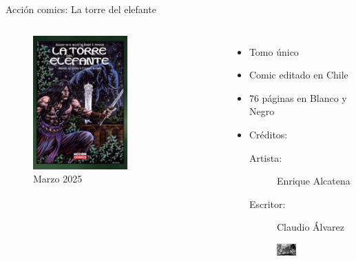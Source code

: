 \begin{frame}{Acción comics: La torre del elefante}
	\begin{columns}
		\begin{figure}[htb]
			\centering
			\includegraphics[width=0.6\textwidth]{img/AlcatenaTorre}
			\caption{Marzo 2025}
		\end{figure}
		\begin{itemize}
			\item Tomo único
			\item Comic editado en Chile
			\item 76 páginas en Blanco y Negro
			\item Créditos:
			\begin{description}
				\item[Artista:] Enrique Alcatena
				\item[Escritor:] Claudio Álvarez
			\end{description}
			\begin{figure}[htb]
				\centering
				\includegraphics[width=0.4\textwidth]{img/AlcatenaTorre2}
			\end{figure}
		\end{itemize}
	\end{columns}
\end{frame}

